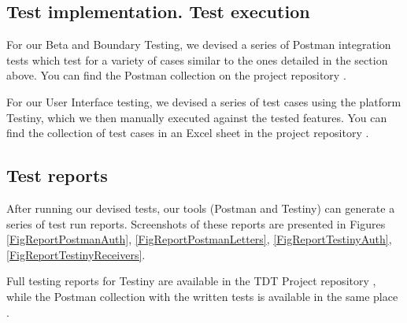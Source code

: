 \documentclass{article}
\begin{document}
\subsection{Test implementation. Test execution}

For our Beta and Boundary Testing, we devised a series of Postman integration tests which test for a variety of cases similar to the ones detailed in the section above. You can find the Postman collection on the project repository \cite{PostmanCollection}.

For our User Interface testing, we devised a series of test cases using the platform Testiny, which we then manually executed against the tested features. You can find the collection of test cases in an Excel sheet in the project repository \cite{TestinyTestCases}.

\subsection{Test reports}

After running our devised tests, our tools (Postman and Testiny) can generate a series of test run reports. Screenshots of these reports are presented in Figures \ref{FigReportPostmanAuth}, \ref{FigReportPostmanLetters}, \ref{FigReportTestinyAuth}, \ref{FigReportTestinyReceivers}.

Full testing reports for Testiny are available in the TDT Project repository \cite{TestinyAuthReport} \cite{TestinyReceiversReport}, while the Postman collection with the written tests is available in the same place \cite{PostmanCollection}.
\end{document}
